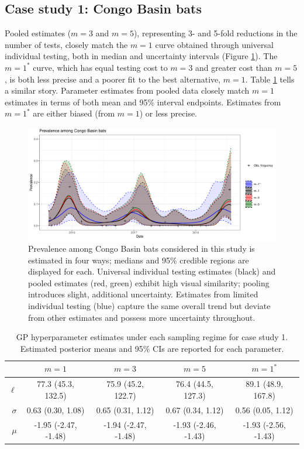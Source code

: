 \documentclass{article}
\begin{document}
\subsection{Case study 1: Congo Basin bats}

Pooled estimates ($m=3$ and $m=5$), representing 3- and 5-fold reductions in the number of tests, closely match the $m=1$ curve obtained through universal individual testing, both in median and uncertainty intervals (Figure \ref{fig2}). The $m=1^*$ curve, which has equal testing cost to $m=3$ and greater cost than $m=5$, is both less precise and a poorer fit to the best alternative, $m=1$.
Table \ref{t3} tells a similar story. Parameter estimates from pooled data closely match $m=1$ estimates in terms of both mean and 95\% interval endpoints. Estimates from $m=1^*$ are either biased (from $m=1$) or less precise. 

\begin{figure}[h!]
\centerline{\includegraphics[width=\textwidth]{Figure2.pdf}}
\caption{Prevalence among Congo Basin bats considered in this study is estimated in four ways; medians and 95\% credible regions are displayed for each. Universal individual testing estimates (black) and pooled estimates (red, green) exhibit high visual similarity; pooling introduces slight, additional uncertainty. Estimates from limited individual testing (blue) capture the same overall trend but deviate from other estimates and possess more uncertainty throughout. \label{fig2}}
\end{figure}

\begin{table} [h]
\caption{GP hyperparameter estimates under each sampling regime for case study 1. Estimated posterior means and 95\% CIs are reported for each parameter.} \centering
\begin{tabular}{ r | c   c   c   c  } \toprule
        & $m=1$ & $m=3$ & $m=5$ &  $m=1^*$\\
\midrule
$\ell$ & 77.3 (45.3, 132.5) & 75.9 (45.2, 122.7)  & 76.4 (44.5, 127.3) & 89.1 (48.9, 167.8)  \\
$\sigma$ & 0.63 (0.30, 1.08) & 0.65 (0.31, 1.12) & 0.67 (0.34, 1.12)  & 0.56  (0.05, 1.12) \\
$\mu$ & -1.95 (-2.47, -1.48) & -1.94  (-2.47,  -1.48) & -1.93 (-2.46,  -1.43) & -1.93 (-2.56,  -1.43) \\
\bottomrule 
\end{tabular}
\label{t3}
\end{table}
\end{document}
